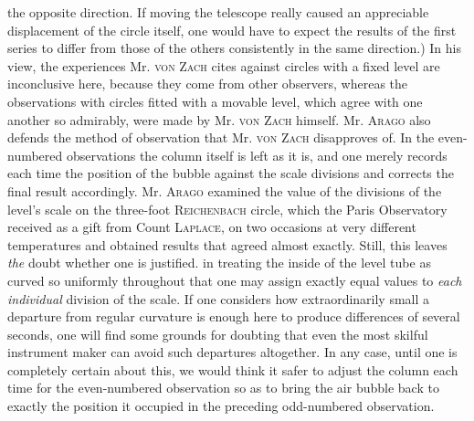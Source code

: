 the opposite direction. If moving the telescope really caused an appreciable displacement of the circle itself, one would have to expect the results of the first series to differ from those of the others consistently in the same direction.) In his view, the experiences Mr. \textsc{von Zach} cites against circles with a fixed level are inconclusive here, because they come from other observers, whereas the observations with circles fitted with a movable level, which agree with one another so admirably, were made by Mr. \textsc{von Zach} himself. Mr. \textsc{Arago} also defends the method of observation that Mr. \textsc{von Zach} disapproves of. In the even-numbered observations the column itself is left as it is, and one merely records each time the position of the bubble against the scale divisions and corrects the final result accordingly. Mr. \textsc{Arago} examined the value of the divisions of the level's scale on the three-foot \textsc{Reichenbach} circle, which the Paris Observatory received as a gift from Count \textsc{Laplace}, on two occasions at very different temperatures and obtained results that agreed almost exactly. Still, this leaves \emph{the} doubt whether one is justified. in treating the inside of the level tube as curved so uniformly throughout that one may assign exactly equal values to \emph{each individual} division of the scale. If one considers how extraordinarily small a departure from regular curvature is enough here to produce differences of several seconds, one will find some grounds for doubting that even the most skilful instrument maker can avoid such departures altogether. In any case, until one is completely certain about this, we would think it safer to adjust the column each time for the even-numbered observation so as to bring the air bubble back to exactly the position it occupied in the preceding odd-numbered observation.

